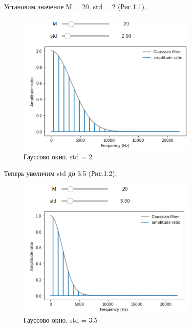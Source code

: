 \documentclass[a4paper,12pt]{report}
\begin{document}
    Установим значение M = 20, std = 2 (Рис.1.1).
\begin{figure}[H]
        \centering
        \includegraphics[width=0.8\textwidth]{fig1-1.PNG}
        \caption{Гауссово окно. std = 2}
        \label{fig:fig1-1}
\end{figure} 
    
    Теперь увеличим std до 3.5 (Рис.1.2).
\begin{figure}[H]
        \centering
        \includegraphics[width=0.8\textwidth]{fig1-2.PNG}
        \caption{Гауссово окно. std = 3.5}
        \label{fig:fig1-2}
\end{figure} 
    
\end{document}
